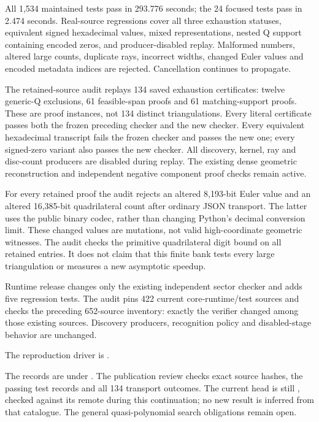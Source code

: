All 1,534 maintained tests pass in 293.776 seconds; the 24 focused tests
pass in 2.474 seconds. Real-source regressions cover all three exhaustion
statuses, equivalent signed hexadecimal values, mixed representations,
nested Q support containing encoded zeros, and producer-disabled replay.
Malformed numbers, altered large counts, duplicate rays, incorrect widths,
changed Euler values and encoded metadata indices are rejected. Cancellation
continues to propagate.

The retained-source audit replays 134 saved exhaustion certificates:
twelve generic-Q exclusions, 61 feasible-span proofs and 61 matching-support
proofs. These are proof instances, not 134 distinct triangulations.
Every literal certificate passes both the frozen preceding checker and the
new checker. Every equivalent hexadecimal transcript fails the frozen
checker and passes the new one; every signed-zero variant also passes the
new checker. All discovery, kernel, ray and disc-count producers are disabled
during replay. The existing dense geometric reconstruction and independent
negative component proof checks remain active.

For every retained proof the audit rejects an altered 8,193-bit Euler
value and an altered 16,385-bit quadrilateral count after ordinary JSON
transport. The latter uses the public binary codec, rather than changing
Python's decimal conversion limit. These changed values are mutations,
not valid high-coordinate geometric witnesses. The audit checks the
primitive quadrilateral digit bound on all retained entries. It does not
claim that this finite bank tests every large triangulation or measures a
new asymptotic speedup.

Runtime release  changes only the existing independent
sector checker and adds five regression tests. The audit pins 422 current
core-runtime/test sources and checks the preceding 652-source inventory: exactly
the verifier changed among those existing sources. Discovery producers,
recognition policy and disabled-stage behavior are unchanged.

The reproduction driver is .

The records are under . The publication review checks exact
source hashes, the passing test records and all 134 transport outcomes.
The current  head is still , checked
against its remote during this continuation; no new result is inferred
from that catalogue. The general quasi-polynomial search obligations remain
open.
